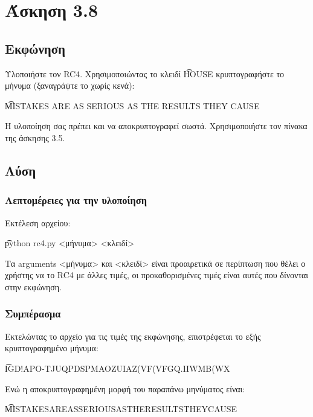 \section{Άσκηση 3.8}

\subsection{Εκφώνηση}

Υλοποιήστε τον RC4. Χρησιμοποιώντας το κλειδί \t{HOUSE} κρυπτογραφήστε το μήνυμα (ξαναγράψτε το χωρίς κενά):
\begin{center}
    \t{MISTAKES ARE AS SERIOUS AS THE RESULTS THEY CAUSE}
\end{center}

Η υλοποίηση σας πρέπει και να αποκρυπτογραφεί σωστά. Χρησιμοποιήστε τον πίνακα
της άσκησης 3.5.

\subsection{Λύση} 

\subsubsection{Λεπτομέρειες για την υλοποίηση}

Εκτέλεση αρχείου:

\begin{center}
    \t{python rc4.py <μήνυμα> <κλειδί>}
\end{center}

Τα arguments <μήνυμα> και <κλειδί> είναι προαιρετικά σε περίπτωση που θέλει ο χρήστης να το RC4 με άλλες τιμές, οι προκαθορισμένες τιμές είναι αυτές που δίνονται στην εκφώνηση.

\subsubsection{Συμπέρασμα}

Εκτελώντας το αρχείο για τις τιμές της εκφώνησης, επιστρέφεται το εξής κρυπτογραφημένο μήνυμα: 

\begin{center}
    \t{IGD!APO-TJUQPDSPMAOZUIAZ(VF(VFGQ.IIWMB(WX}
\end{center}

Ενώ η αποκρυπτογραφημένη μορφή του παραπάνω μηνύματος είναι: 

\begin{center}
    \t{MISTAKESAREASSERIOUSASTHERESULTSTHEYCAUSE}
\end{center}